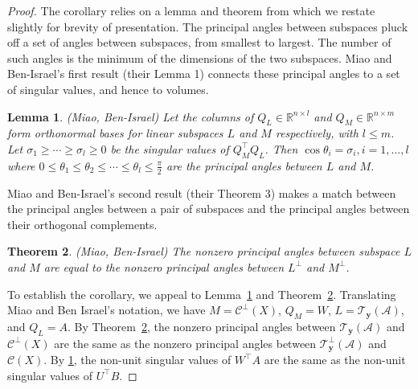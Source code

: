 \documentclass[ba]{imsart}
\newcommand{\mc}{\mathcal}
\newtheorem{theorem}{Theorem}[section]
\newtheorem{lemma}[theorem]{\bf Lemma}
\begin{document}
\begin{proof}
The corollary relies on a lemma and theorem from \cite{miao1992} which we restate 
slightly for brevity of presentation.  The principal angles between subspaces pluck off a
set of angles between subspaces, from smallest to largest.  The number of such angles 
is the minimum of the dimensions of the two subspaces.  Miao and Ben-Israel's first result
(their Lemma 1) connects these principal angles to a set of singular values, and hence to 
volumes.   
\begin{lemma}{(Miao, Ben-Israel)}
\label{MBI:lemma}
Let the columns of $Q_L\in \mathbb{R}^{n\times l}$ and $Q_M\in
\mathbb{R}^{n\times m}$ form orthonormal bases for linear subspaces
$L$ and $M$ respectively, with $l \leq m$. Let $\sigma_1\geq\cdots\geq
\sigma_l\geq0$ be the singular values of $Q_M^\top Q_L$. Then $\cos
\theta_i=\sigma_i, i=1,\dots,l$ where $0\leq\theta_1\leq\theta_2\leq
\cdots \leq\theta_l\leq\frac{\pi}{2}$ are the principal angles between $L$ and $M$.  
\end{lemma}

Miao and Ben-Israel's second result (their Theorem 3) makes a match between the principal
angles between a pair of subspaces and the principal angles between their orthogonal complements.  
\begin{theorem}{(Miao, Ben-Israel)}
\label{MBI:thm}
The nonzero principal angles between subspace $L$ and $M$ are equal to the 
nonzero principal angles between $L^\perp$ and $M^\perp$.
\end{theorem}

To establish the corollary, we appeal to Lemma~\ref{MBI:lemma} and Theorem~\ref{MBI:thm}.  Translating Miao and Ben Israel's
notation, we have $M=\mc C^\perp (X)$, $Q_M=W$, $L=\mc
T_{\boldsymbol{y}}(\mc{A})$, and $Q_L= A$. By Theorem~\ref{MBI:thm}, the
nonzero principal angles between $\mc{T}_{\boldsymbol{y}}(\mc{A})$ and
$\mc C^\perp(X)$ are the same as the nonzero principal angles between
$\mathcal{T}_{\boldsymbol{y}}^\perp(\mathcal{A})$ and $\mc C(X)$. By
\ref{MBI:lemma}, the non-unit singular values of $W^\top A$ are the
same as the non-unit singular values of $U^\top B$.  
\end{proof}
\end{document}
